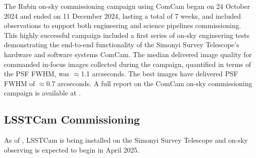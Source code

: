 The Rubin on-sky commissioning campaign using ComCam began on 24 October 2024 and ended on 11 December 2024, lasting a total of 7 weeks, and included observations to support both engineering and science pipelines commissioning.
This highly successful campaign included a first series of on-sky engineering tests demonstrating the end-to-end functionality of the Simonyi Survey Telescope’s hardware and software systems ComCam.
The median delivered image quality  for commanded in-focus images collected during the campaign, quantified in terms of the PSF FWHM, was $\approx$1.1 arcseconds. 
The best images have delivered PSF FWHM of $\approx$0.7 arcseconds.
A full report on the ComCam on-sky commissioning campaign is available at .


\subsection{LSSTCam Commissioning }
\label{ssec:commissioning-lsstcam}

As of \currentdate, LSSTCam is being installed on the Simonyi Survey Telescope and on-sky observing is expected to begin in April 2025.


